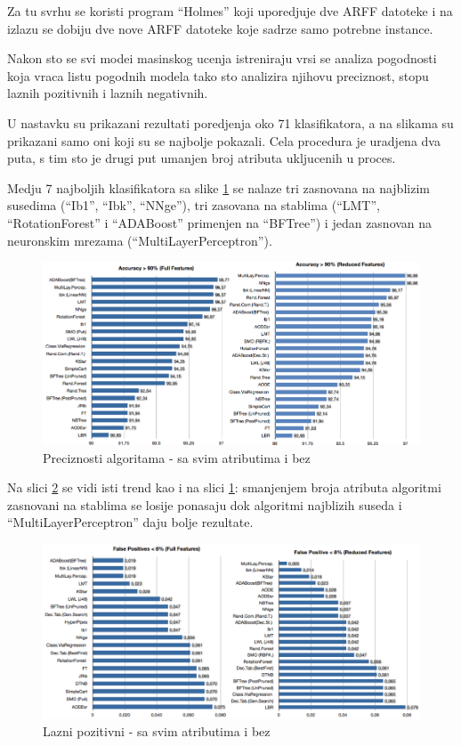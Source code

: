 \documentclass[a4paper]{article}
\begin{document}
{Za tu svrhu se koristi program ``Holmes'' koji uporedjuje dve ARFF datoteke i na izlazu se dobiju dve nove ARFF datoteke koje sadrze samo potrebne  instance.

Nakon sto se svi modei masinskog ucenja istreniraju vrsi se analiza pogodnosti
koja vraca listu pogodnih modela tako sto analizira njihovu preciznost, stopu laznih pozitivnih i laznih negativnih.

U nastavku su prikazani rezultati poredjenja oko 71 klasifikatora, a na slikama su prikazani samo oni koji su se najbolje pokazali. Cela procedura je uradjena dva puta, s tim sto je drugi put umanjen broj atributa ukljucenih u proces.

Medju 7 najboljih klasifikatora sa slike \ref{fig:acc} se nalaze tri zasnovana na najblizim susedima (``Ib1'', ``Ibk'', ``NNge''), tri zasovana na stablima
(``LMT'', ``RotationForest'' i ``ADABoost'' primenjen na ``BFTree'') i jedan zasnovan na neuronskim mrezama (``MultiLayerPerceptron'').


\begin{figure}[h!]
\centering
\includegraphics[width=\textwidth]{accuracy.png}
\caption{Preciznosti algoritama - sa svim atributima i bez}
\label{fig:acc}
\end{figure}

Na slici  \ref{fig:falsePos} se vidi isti trend kao i na slici  \ref{fig:acc}: smanjenjem broja atributa algoritmi zasnovani na stablima se losije ponasaju dok algoritmi najblizih suseda i ``MultiLayerPerceptron'' daju bolje rezultate.

\begin{figure}[h!]
\centering
\includegraphics[width=\textwidth]{false_positive.png}
\caption{Lazni pozitivni - sa svim atributima i bez}
\label{fig:falsePos}
\end{figure}

}
\end{document}
